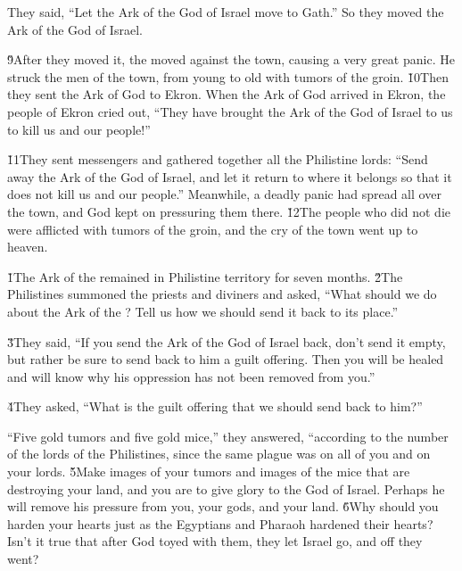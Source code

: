 They said, ``Let the Ark of the God of Israel move to Gath.'' So they moved the Ark of the God of Israel.

\v{9}After they moved it, the  moved against the town, causing a very great panic. He struck the men of the town, from young to old with tumors of the groin. \v{10}Then they sent the Ark of God to Ekron. When the Ark of God arrived in Ekron, the people of Ekron cried out, ``They have brought the Ark of the God of Israel to us to kill us and our people!''

\v{11}They sent messengers and gathered together all the Philistine lords: ``Send away the Ark of the God of Israel, and let it return to where it belongs so that it does not kill us and our people.'' Meanwhile, a deadly panic had spread all over the town, and God kept on pressuring them there. \v{12}The people who did not die were afflicted with tumors of the groin, and the cry of the town went up to heaven.

\v{1}The Ark of the  remained in Philistine territory for seven months. \v{2}The Philistines summoned the priests and diviners and asked, ``What should we do about the Ark of the ? Tell us how we should send it back to its place.''

\v{3}They said, ``If you send the Ark of the God of Israel back, don't send it empty, but rather be sure to send back to him a guilt offering. Then you will be healed and will know why his oppression has not been removed from you.''

\v{4}They asked, ``What is the guilt offering that we should send back to him?''

``Five gold tumors and five gold mice,'' they answered, ``according to the number of the lords of the Philistines, since the same plague was on all of you and on your lords. \v{5}Make images of your tumors and images of the mice that are destroying your land, and you are to give glory to the God of Israel. Perhaps he will remove his pressure from you, your gods, and your land. \v{6}Why should you harden your hearts just as the Egyptians and Pharaoh hardened their hearts? Isn't it true that after God toyed with them, they let Israel go, and off they went?

